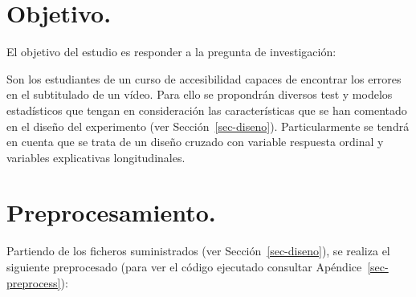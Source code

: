 \documentclass[
  12pt,
  a4paper,
  extrafontsizes,
  onecolumn,
  openright]{memoir}
\begin{document}
\hypertarget{objetivo.}{%
\section{Objetivo.}\label{objetivo.}}

El objetivo del estudio es responder a la pregunta de investigación:

Son los estudiantes de un curso de accesibilidad capaces de encontrar
los errores en el subtitulado de un vídeo. Para ello se propondrán
diversos test y modelos estadísticos que tengan en consideración las
características que se han comentado en el diseño del experimento (ver
Sección~\ref{sec-diseno}). Particularmente se tendrá en cuenta que se
trata de un diseño cruzado con variable respuesta ordinal y variables
explicativas longitudinales.

\hypertarget{preprocesamiento.}{%
\section{Preprocesamiento.}\label{preprocesamiento.}}

Partiendo de los ficheros suministrados (ver Sección~\ref{sec-diseno}),
se realiza el siguiente preprocesado (para ver el código ejecutado
consultar Apéndice~\ref{sec-preprocess}):
\end{document}
